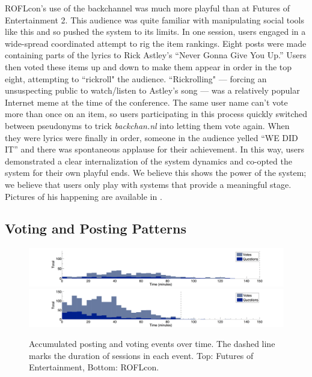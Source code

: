 ROFLcon's use of the backchannel was much more playful than at Futures of Entertainment 2. This audience was quite familiar with manipulating social tools like this and so pushed the system to its limits. In one session, users engaged in a wide-spread coordinated attempt to rig the item rankings. Eight posts were made containing parts of the lyrics to Rick Astley's ``Never Gonna Give You Up.'' \citep{Anonymous:2007ti} Users then voted these items up and down to make them appear in order in the top eight, attempting to ``rickroll" the audience. ``Rickrolling" — forcing an unsuspecting public to watch/listen to Astley's song — was a relatively popular Internet meme at the time of the conference. The same user name can't vote more than once on an item, so users participating in this process quickly switched between pseudonyms to trick \emph{backchan.nl} into letting them vote again. When they were lyrics were finally in order, someone in the audience yelled ``WE DID IT'' and there was spontaneous applause for their achievement. In this way, users demonstrated a clear internalization of the system dynamics and co-opted the system for their own playful ends. We believe this shows the power of the system; we believe that users only play with systems that provide a meaningful stage. Pictures of his happening are available in \citep{Chillag:2008wr}.

\subsection{Voting and Posting Patterns}

\begin{figure}[t]
	\includegraphics{figures/backchannl/foe2_posting_history.png}
	\includegraphics{figures/backchannl/roflcon_figure.png}

	\caption{Accumulated posting and voting events over time. The dashed line marks the duration of sessions in each event. Top: Futures of Entertainment, Bottom: ROFLcon.}
	\label{fig:posting_time_patterns}
\end{figure}

